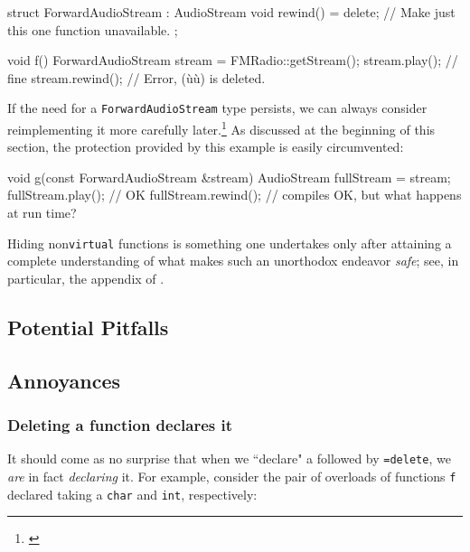 \begin{emcppslisting}[emcppsbatch=e2]
struct ForwardAudioStream : AudioStream
{
    void rewind() = delete; // Make just this one function unavailable.
};

void f()
{
    ForwardAudioStream stream = FMRadio::getStream();
    stream.play();   // fine
    stream.rewind(); // Error, (ù{}ù) is deleted.
}
\end{emcppslisting}

\noindent If the need for a \lstinline!ForwardAudioStream! type persists, we can always
consider reimplementing it more carefully later.{\cprotect\footnote{\cite[sections 3.5.10.5 and 3.7.3, pp.~687--703 and 726--727]{lakos20}}} As discussed at the beginning of this section, the protection provided by this example is easily circumvented:
\begin{emcppslisting}[emcppsbatch=e2]
void g(const ForwardAudioStream &stream)
{
    AudioStream fullStream = stream;
    fullStream.play();   // OK
    fullStream.rewind(); // compiles OK, but what happens at run time?
}
\end{emcppslisting}

\noindent Hiding non\lstinline!virtual! functions is something one undertakes only after attaining a complete understanding of what makes such an unorthodox endeavor \emph{safe}; see, in particular, the appendix of .

\subsection[Potential Pitfalls]{Potential Pitfalls}\label{potential-pitfalls}

\hspace*{\fill}
\newpage%

\subsection[Annoyances]{Annoyances}\label{annoyances}

\subsubsection[Deleting a function declares it]{Deleting a function declares it}

It should come as no surprise that when we ``declare" a 
followed by \lstinline!=delete!, we \emph{are} in fact \emph{declaring} it.  For example, consider
the pair of overloads of functions \lstinline!f! declared taking a \lstinline!char! and \lstinline!int!,
respectively:

